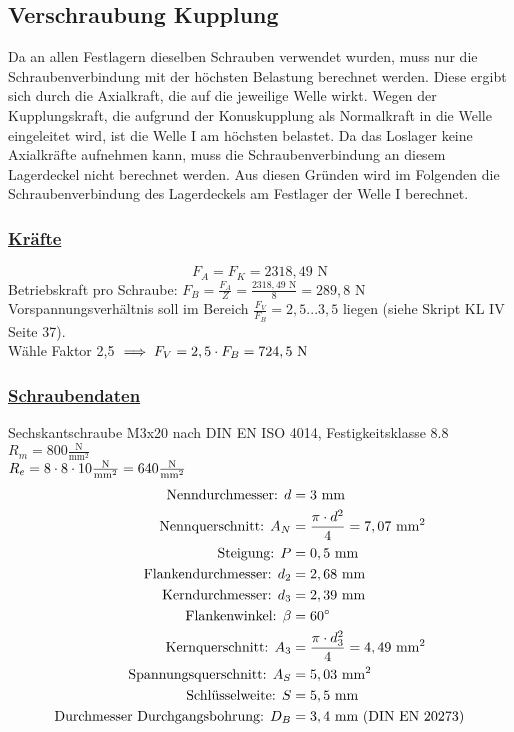 \subsection{Verschraubung Kupplung}
Da an allen Festlagern dieselben Schrauben verwendet wurden, muss nur die Schraubenverbindung mit der höchsten Belastung berechnet werden. Diese ergibt sich durch die Axialkraft, die auf die jeweilige Welle wirkt. Wegen der Kupplungskraft, die aufgrund der Konuskupplung als Normalkraft in die Welle eingeleitet wird, ist die Welle I am höchsten belastet. Da das Loslager keine Axialkräfte aufnehmen kann, muss die Schraubenverbindung an diesem Lagerdeckel nicht berechnet werden. 
Aus diesen Gründen wird im Folgenden die Schraubenverbindung des Lagerdeckels am Festlager der Welle I berechnet.
\subsubsection{\underline{Kräfte}}
\[
F_A = F_K = 2318,49 \text{ N}
\]
\flushleft
Betriebskraft pro Schraube: $F_B = \frac{F_A}{Z} = \frac{2318,49 \text{ N}}{8} = 289,8 \text{ N}$ \\
Vorspannungsverhältnis soll im Bereich $\frac{F_V}{F_B} = 2,5...3,5$ liegen (siehe Skript KL IV  Seite 37). \\
\vspace{.5cm}
Wähle Faktor 2,5 $\implies F_V = 2,5 \cdot F_B = 724,5 \text{ N}$

\newpage
\subsubsection{\underline{Schraubendaten}}
Sechskantschraube M3x20 nach DIN EN ISO 4014, Festigkeitsklasse 8.8\\
$R_m = 800 \frac{\text{N}}{\text{mm}^2}$\\
$R_e = 8\cdot8\cdot10\frac{\text{N}}{\text{mm}^2} = 640 \frac{\text{N}}{\text{mm}^2}$\\
\begin{align*}
\text{Nenndurchmesser: } d &= 3\text{ mm}\\
\text{Nennquerschnitt: } A_N &= \frac{\pi\cdot d^2}{4} = 7,07\text{ mm}^2\\
\text{Steigung: } P &= 0,5\text{ mm}\\
\text{Flankendurchmesser: } d_2 &= 2,68\text{ mm}\\
\text{Kerndurchmesser: } d_3 &= 2,39 \text{ mm}\\
\text{Flankenwinkel: } \beta &= 60^{\circ}\\
\text{Kernquerschnitt: } A_3 &= \frac{\pi\cdot d_3^2}{4} = 4,49\text{ mm}^2\\
\text{Spannungsquerschnitt: } A_S &= 5,03 \text{ mm}^2\\
\text{Schlüsselweite: } S &= 5,5 \text{ mm}\\
\text{Durchmesser Durchgangsbohrung: } D_B &= 3,4 \text{ mm} \text{ (DIN EN 20273)}
\end{align*}
\newpage

